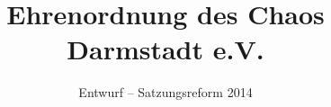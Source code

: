 \documentclass[ngerman]{article}
\begin{document}
\title{Ehrenordnung des Chaos Darmstadt e.V.}

\date{Entwurf -- Satzungsreform 2014}

\maketitle
\end{document}
